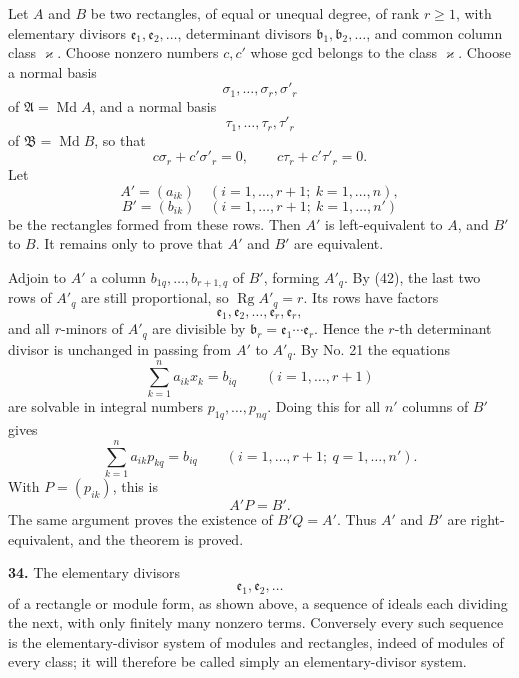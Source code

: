 \documentclass[11pt,a4paper]{article}
\begin{document}
Let \(A\) and \(B\) be two rectangles, of equal or unequal degree, of rank \(r\ge1\), with elementary divisors \(\mathfrak e_1,\mathfrak e_2,\ldots\), determinant divisors \(\mathfrak b_1,\mathfrak b_2,\ldots\), and common column class \(\varkappa\). Choose nonzero numbers \(c,c'\) whose gcd belongs to the class \(\varkappa\). Choose a normal basis
\[
 \sigma_1,\ldots,\sigma_r,\sigma'_r
\]
of \(\mathfrak A=\operatorname{Md}A\), and a normal basis
\[
 \tau_1,\ldots,\tau_r,\tau'_r
\]
of \(\mathfrak B=\operatorname{Md}B\), so that
\[
 c\sigma_r+c'\sigma'_r=0,\qquad c\tau_r+c'\tau'_r=0. \tag{42}
\]
Let
\[
 A'=(a_{ik})\quad(i=1,\ldots,r+1;\ k=1,\ldots,n),
\]
\[
 B'=(b_{ik})\quad(i=1,\ldots,r+1;\ k=1,\ldots,n')
\]
be the rectangles formed from these rows. Then \(A'\) is left-equivalent to \(A\), and \(B'\) to \(B\). It remains only to prove that \(A'\) and \(B'\) are equivalent.

Adjoin to \(A'\) a column \(b_{1q},\ldots,b_{r+1,q}\) of \(B'\), forming \(A'_q\). By (42), the last two rows of \(A'_q\) are still proportional, so \(\operatorname{Rg}A'_q=r\). Its rows have factors
\[
 \mathfrak e_1,\mathfrak e_2,\ldots,\mathfrak e_r,\mathfrak e_r,
\]
and all \(r\)-minors of \(A'_q\) are divisible by \(\mathfrak b_r=\mathfrak e_1\cdots\mathfrak e_r\). Hence the \(r\)-th determinant divisor is unchanged in passing from \(A'\) to \(A'_q\). By No. 21 the equations
\[
 \sum_{k=1}^{n}a_{ik}x_k=b_{iq}\qquad(i=1,\ldots,r+1)
\]
are solvable in integral numbers \(p_{1q},\ldots,p_{nq}\). Doing this for all \(n'\) columns of \(B'\) gives
\[
 \sum_{k=1}^{n}a_{ik}p_{kq}=b_{iq}\qquad(i=1,\ldots,r+1;\ q=1,\ldots,n'). \tag{43}
\]
With \(P=(p_{ik})\), this is
\[
 A'P=B'.
\]
The same argument proves the existence of \(B'Q=A'\). Thus \(A'\) and \(B'\) are right-equivalent, and the theorem is proved.

\textbf{34.} The elementary divisors
\[
 \mathfrak e_1,\mathfrak e_2,\ldots
\]
of a rectangle or module form, as shown above, a sequence of ideals each dividing the next, with only finitely many nonzero terms. Conversely every such sequence is the elementary-divisor system of modules and rectangles, indeed of modules of every class; it will therefore be called simply an elementary-divisor system.
\end{document}
